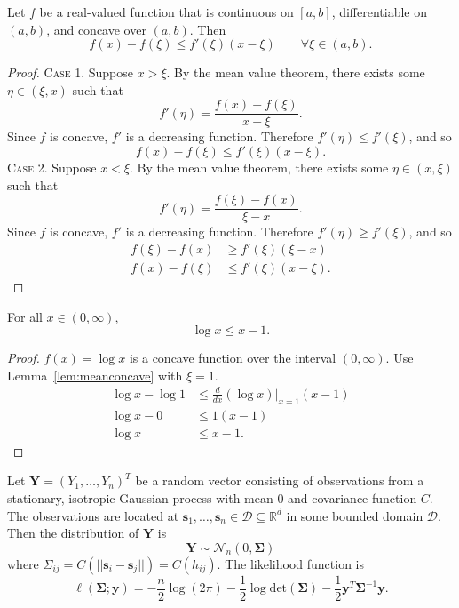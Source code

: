 \label{app:theorems_and_proofs}

\begin{lemma} \label{lem:meanconcave}
  Let $f$ be a real-valued function that is continuous on $[a, b]$, differentiable on $(a, b)$, and concave over $(a, b)$. Then
  \[
    f(x) - f(\xi) \leq f'(\xi) (x - \xi) \qquad \forall \xi \in (a, b).
  \]
\end{lemma}

\begin{proof}
  \textsc{Case 1.} Suppose $x > \xi$. By the mean value theorem, there exists some $\eta \in (\xi, x)$ such that
  \[
    f'(\eta) = \frac{f(x) - f(\xi)}{x - \xi}.
  \]
  Since $f$ is concave, $f'$ is a decreasing function. Therefore $f'(\eta) \leq f'(\xi)$, and so
  \[
    f(x) - f(\xi) \leq f'(\xi) (x - \xi).
  \]
  \textsc{Case 2.} Suppose $x < \xi$. By the mean value theorem, there exists some $\eta \in (x, \xi)$ such that
  \[
    f'(\eta) = \frac{f(\xi) - f(x)}{\xi - x}.
  \]
  Since $f$ is concave, $f'$ is a decreasing function. Therefore $f'(\eta) \geq f'(\xi)$, and so
  \begin{align*}
    f(\xi) - f(x) &\geq f'(\xi) (\xi - x) \\
    f(x) - f(\xi) &\leq f'(\xi) (x - \xi).
  \end{align*}
\end{proof}

\begin{lemma} \label{lem:logineq}
  For all $x \in (0, \infty)$,
  \[
    \log x \leq x - 1.
  \]
\end{lemma}

\begin{proof}
  $f(x) = \log x$ is a concave function over the interval $(0, \infty)$. Use Lemma~\ref{lem:meanconcave} with $\xi = 1$.
  \begin{align*}
    \log x - \log 1 &\leq \frac{d}{dx}(\log x) \Big|_{x=1} (x - 1) \\
    \log x - 0 &\leq 1 (x - 1) \\
    \log x &\leq x - 1.
  \end{align*}
\end{proof}

Let $\bm{Y} = (Y_1, \dots, Y_n)^T$ be a random vector consisting of observations from a stationary, isotropic Gaussian process with mean 0 and covariance function $C$. The observations are located at $\bm{s}_1, \dots, \bm{s}_n \in \mathcal{D} \subseteq \mathbb{R}^d$ in some bounded domain $\mathcal{D}$. Then the distribution of $\bm{Y}$ is
\[
  \bm{Y} \sim \mathcal{N}_n(0, \bm{\Sigma})
\]
where $\Sigma_{ij} = C(||\bm{s}_i - \bm{s}_j||) = C(h_{ij})$. The likelihood function is
\[
  \ell(\bm{\Sigma}; \bm{y}) = -\frac{n}{2} \log(2\pi) - \frac{1}{2} \log \textrm{det}(\bm{\Sigma}) - \frac{1}{2} \bm{y}^T \bm{\Sigma}^{-1} \bm{y}.
\]




